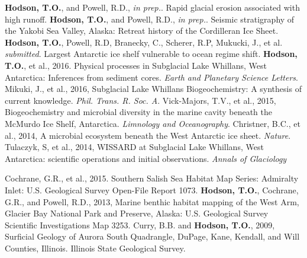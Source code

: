 \renewcommand{\refname}{Publications}
\begin{thebibliography}{1}
\bibitem{}\textbf{Hodson, T.O.}, and Powell, R.D., \textsl{in prep.}. Rapid glacial erosion associated with high runoff.
\bibitem{}\textbf{Hodson, T.O.}, and Powell, R.D., \textsl{in prep.}. Seismic stratigraphy of the Yakobi Sea Valley, Alaska: Retreat history of the Cordilleran Ice Sheet.
\bibitem{}\textbf{Hodson, T.O.}, Powell, R.D, Branecky, C., Scherer, R.P, Mukucki, J., et al. 
\textsl{submitted}. Largest Antarctic ice shelf vulnerable to ocean regime shift.
\bibitem{}\textbf{Hodson, T.O.}, et al., 2016. Physical processes in Subglacial Lake Whillans, West Antarctica: Inferences from sediment cores.
\textsl{Earth and Planetary Science Letters}.
\bibitem{}Mikuki, J., et al., 2016, Subglacial Lake Whillans Biogeochemistry: A synthesis of current knowledge. \textsl{Phil. Trans. R. Soc. A}.
\bibitem{}Vick-Majors, T.V., et al., 2015, Biogeochemistry and microbial diversity in the marine cavity beneath the McMurdo Ice Shelf, Antarctica.
\textsl{Limnology and Oceanography}.
\bibitem{}Christner, B.C., et al., 2014, A microbial ecosystem beneath the West Antarctic ice sheet. \textsl{Nature}.
\bibitem{}Tulaczyk, S, et al., 2014, WISSARD at Subglacial Lake Whillans, West Antarctica: scientific operations and initial observations. \textsl{Annals of Glaciology}
\end{thebibliography}
\renewcommand{\refname}{Other Publications}
\begin{thebibliography}{1}
\bibitem{}Cochrane, G.R., et al., 2015. Southern Salish Sea Habitat Map Series: Admiralty Inlet: U.S. Geological Survey Open-File Report 1073.
\bibitem{}\textbf{Hodson, T.O.}, Cochrane, G.R., and Powell, R.D., 2013, Marine benthic habitat mapping of the West Arm, Glacier Bay National Park and Preserve, Alaska: U.S. Geological Survey Scientific Investigations Map 3253.
\bibitem{}Curry, B.B. and \textbf{Hodson, T.O.}, 2009, Surficial Geology of Aurora South Quadrangle, DuPage, Kane, Kendall, and Will Counties, Illinois. Illinois State Geological Survey.
\end{thebibliography}

